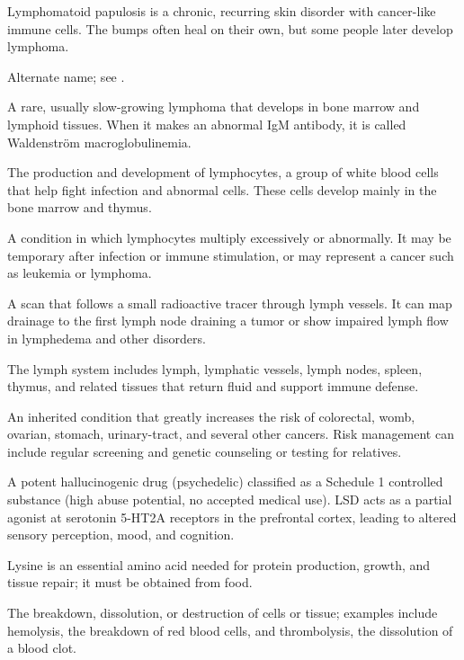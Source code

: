  Lymphomatoid papulosis is a chronic, recurring skin disorder with cancer-like immune cells. The bumps often heal on their own, but some people later develop lymphoma.

 Alternate name; see .

 A rare, usually slow-growing lymphoma that develops in bone marrow and lymphoid tissues. When it makes an abnormal IgM antibody, it is called Waldenström macroglobulinemia.

 The production and development of lymphocytes, a group of white blood cells that help fight infection and abnormal cells. These cells develop mainly in the bone marrow and thymus.

 A condition in which lymphocytes multiply excessively or abnormally. It may be temporary after infection or immune stimulation, or may represent a cancer such as leukemia or lymphoma.

 A scan that follows a small radioactive tracer through lymph vessels. It can map drainage to the first lymph node draining a tumor or show impaired lymph flow in lymphedema and other disorders.

 The lymph system includes lymph, lymphatic vessels, lymph nodes, spleen, thymus, and related tissues that return fluid and support immune defense.

 An inherited condition that greatly increases the risk of colorectal, womb, ovarian, stomach, urinary-tract, and several other cancers. Risk management can include regular screening and genetic counseling or testing for relatives.

 A potent hallucinogenic drug (psychedelic) classified as a Schedule 1 controlled
substance (high abuse potential, no accepted medical use). LSD acts as a partial agonist
at serotonin 5-HT2A receptors in the prefrontal cortex, leading to altered sensory
perception, mood, and cognition.

 Lysine is an essential amino acid needed for protein production, growth, and tissue repair; it must be obtained from food.

 The breakdown, dissolution, or destruction of cells or tissue; examples include hemolysis, the breakdown of red blood cells, and thrombolysis, the dissolution of a blood clot.

